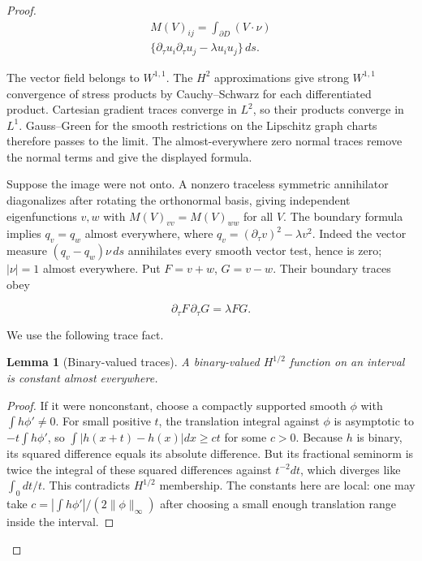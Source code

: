 \documentclass[11pt]{article}
\newtheorem{lemma}[theorem]{Lemma}
\theoremstyle{definition}
\theoremstyle{remark}
\numberwithin{equation}{section}
\begin{document}
\begin{proof}
\begin{equation}\label{eq:src-11-03}
\begin{gathered}
M(V)_{ij}=\int_{\partial D}(V\cdot\nu) \\
\{\partial_\tau u_i\partial_\tau u_j-\lambda u_iu_j\}\,ds.
\end{gathered}
\end{equation}

The vector field belongs to $W^{1,1}$. The $H^2$ approximations give strong $W^{1,1}$ convergence of stress products by Cauchy--Schwarz for each differentiated product. Cartesian gradient traces converge in $L^2$, so their products converge in $L^1$. Gauss--Green for the smooth restrictions on the Lipschitz graph charts therefore passes to the limit. The almost-everywhere zero normal traces remove the normal terms and give the displayed formula.

Suppose the image were not onto. A nonzero traceless symmetric annihilator diagonalizes after rotating the orthonormal basis, giving independent eigenfunctions $v,w$ with $M(V)_{vv}=M(V)_{ww}$ for all $V$. The boundary formula implies $q_v=q_w$ almost everywhere, where $q_v=(\partial_\tau v)^2-\lambda v^2$. Indeed the vector measure $(q_v-q_w)\nu\,ds$ annihilates every smooth vector test, hence is zero; $|\nu|=1$ almost everywhere. Put $F=v+w$, $G=v-w$. Their boundary traces obey

\begin{equation}\label{eq:src-11-04}
\partial_\tau F\,\partial_\tau G=\lambda FG.
\end{equation}

We use the following trace fact.
\begin{lemma}[Binary-valued traces]\label{lem:binary-half}
A binary-valued $H^{1/2}$ function on an interval is constant almost everywhere.
\end{lemma}
\begin{proof}
If it were nonconstant, choose a compactly supported smooth $\phi$ with $\int h\phi'\ne0$. For small positive $t$, the translation integral against $\phi$ is asymptotic to $-t\int h\phi'$, so $\int|h(x+t)-h(x)|dx\ge c t$ for some $c>0$. Because $h$ is binary, its squared difference equals its absolute difference. But its fractional seminorm is twice the integral of these squared differences against $t^{-2}dt$, which diverges like $\int_0 dt/t$. This contradicts $H^{1/2}$ membership. The constants here are local: one may take $c=|\int h\phi'|/(2\|\phi\|_\infty)$ after choosing a small enough translation range inside the interval.
\end{proof}


\end{proof}
\end{document}
